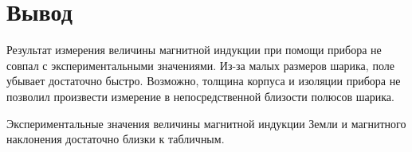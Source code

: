 \documentclass[a4paper, 12pt]{article}
\begin{document}
    \section{Вывод}

        Результат измерения величины магнитной индукции при помощи прибора не совпал с экспериментальными значениями. Из-за малых размеров шарика, поле убывает достаточно быстро. Возможно, толщина корпуса и изоляции прибора не позволил произвести измерение в непосредственной близости полюсов шарика.

        Экспериментальные значения величины магнитной индукции Земли и магнитного наклонения достаточно близки к табличным.
\end{document}
